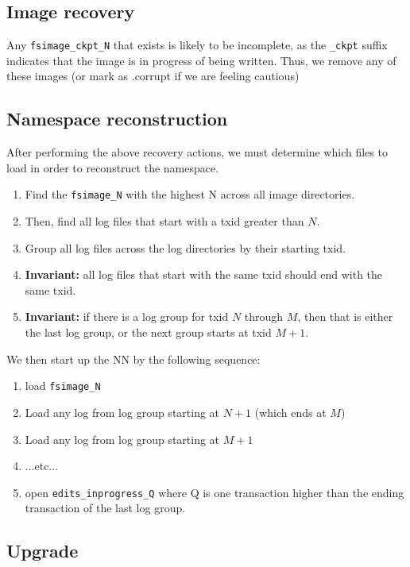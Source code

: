 \documentclass{article}
\begin{document}
\subsection{Image recovery}

Any {\tt fsimage\_ckpt\_N} that exists is likely to be incomplete, as the {\tt \_ckpt} suffix indicates that the image is in progress of being written. Thus, we remove any of these images (or mark as .corrupt if we are feeling cautious)

\subsection{Namespace reconstruction}
\label{ns-reconstruction}
After performing the above recovery actions, we must determine which files to load in order to reconstruct the namespace.

\begin{enumerate}
\item Find the {\tt fsimage\_N} with the highest N across all image directories.
\item Then, find all log files that start with a txid greater than $N$.
\item Group all log files across the log directories by their starting txid.
\item {\bf Invariant:} all log files that start with the same txid should end with the same txid.
\item {\bf Invariant:} if there is a log group for txid $N$ through $M$, then that is either the last log group, or the next group starts at txid $M+1$.
\end{enumerate}

We then start up the NN by the following sequence:
\begin{enumerate}
\item load {\tt fsimage\_N}
\item Load any log from log group starting at $N+1$ (which ends at $M$)
\item Load any log from log group starting at $M+1$
\item ...etc...
\item open {\tt edits\_inprogress\_Q} where Q is one transaction higher than the ending transaction of the last log group.
\end{enumerate}

\subsection{Upgrade}
\end{document}
